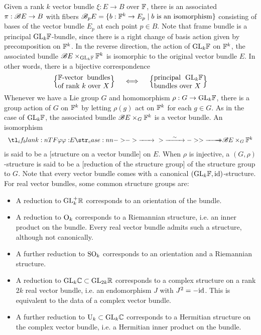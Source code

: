 Given a rank $k$ vector bundle $\xi : E \to B$ over $\mathbb{F}$, there is an associated  $\pi : \mathscr{B} E \to B$ with fibers $\mathscr{B}_p E = \{ b : \mathbb{F}^k \to E_p \mid b\textrm{ is an isomorphism}\}$ consisting of bases of the vector bundle $E_p$ at each point $p\in B$. Note that frame bundle is a principal $\mathrm{GL}_k\mathbb{F}$-bundle, since there is a right change of basis action given by precomposition on $\mathbb{F}^k$.
In the reverse direction, the action of $\mathrm{GL}_k\mathbb{F}$ on $\mathbb{F}^k$, the associated bundle $\mathscr{B} E\times_{\mathrm{GL}_k\mathbb{F}} \mathbb{F}^k$ is isomorphic to the original vector bundle $E$. In other words, there is a bijective correspondence
\begin{equation}\label{eq:principal-GL-bundle-vector-bundle}
	\left\{\parbox{7.5em}{$\F$-vector bundles of rank $k$ over $X$}\right\}
	\quad\iff\quad
	\left\{\parbox{7em}{principal $\GL_k\F$ bundles over $X$}\right\}
\end{equation}
Whenever we have a Lie group $G$ and homomorphism $\rho : G \to \mathrm{GL}_k\mathbb{F}$, there is a group action of $G$ on $\mathbb{F}^k$ by letting $\rho(g)$ act on $\mathbb{F}^k$ for each $g\in G$. As in the case of $\mathrm{GL}_k \mathbb{F}$, the associated bundle $\mathscr{B} E\times_G \mathbb{F}^k$ is a vector bundle. An isomorphism
\begin{equation}\label{eq:structure-on-a-vector-bundle}
	\lkxfunc{\varphi}{E}{\B E\times_G \F^k}
\end{equation}
is said to be a [structure on a vector bundle] on $E$. When $\rho$ is injective, a $(G,\rho)$-structure is said to be a [reduction of the structure group] of the structure group to $G$.
Note that every vector bundle comes with a canonical $(\mathrm{GL}_k \mathbb{F}, \mathrm{id})$-structure.
For real vector bundles, some common structure groups are:
\begin{itemize}
	\item A reduction to $\mathrm{GL}^+_k\mathbb{R}$ corresponds to an orientation of the bundle.
	\item A reduction to $\mathrm{O}_k$ corresponds to a Riemannian structure, i.e. an inner product on the bundle. Every real vector bundle admits such a structure, although not canonically.
	\item A further reduction to $\mathrm{SO}_k$ corresponds to an orientation and a Riemannian structure.
	\item A reduction to $\mathrm{GL}_{k}\mathbb{C}\subset \mathrm{GL}_{2k}\mathbb{R}$ corresponds to a complex structure on a rank $2k$ real vector bundle, i.e. an endomorphism $J$ with $J^2=-\mathrm{id}$. This is equivalent to the data of a complex vector bundle.
	\item A further reduction to $\mathrm{U}_k\subset \mathrm{GL}_k\mathbb{C}$ corresponds to a Hermitian structure on the complex vector bundle, i.e. a Hermitian inner product on the bundle.
\end{itemize}

